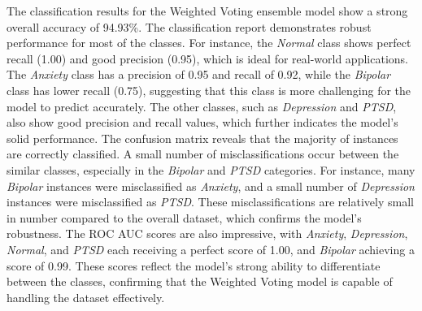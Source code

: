 \noindent
The classification results for the Weighted Voting ensemble model show a strong overall accuracy of 94.93\%. The classification report demonstrates robust performance for most of the classes. For instance, the \textit{Normal} class shows perfect recall (1.00) and good precision (0.95), which is ideal for real-world applications. The \textit{Anxiety} class has a precision of 0.95 and recall of 0.92, while the \textit{Bipolar} class has lower recall (0.75), suggesting that this class is more challenging for the model to predict accurately. The other classes, such as \textit{Depression} and \textit{PTSD}, also show good precision and recall values, which further indicates the model's solid performance. The confusion matrix reveals that the majority of instances are correctly classified. A small number of misclassifications occur between the similar classes, especially in the \textit{Bipolar} and \textit{PTSD} categories. For instance, many \textit{Bipolar} instances were misclassified as \textit{Anxiety}, and a small number of \textit{Depression} instances were misclassified as \textit{PTSD}. These misclassifications are relatively small in number compared to the overall dataset, which confirms the model’s robustness. The ROC AUC scores are also impressive, with \textit{Anxiety}, \textit{Depression}, \textit{Normal}, and \textit{PTSD} each receiving a perfect score of 1.00, and \textit{Bipolar} achieving a score of 0.99. These scores reflect the model's strong ability to differentiate between the classes, confirming that the Weighted Voting model is capable of handling the dataset effectively.

\vspace{1em}

